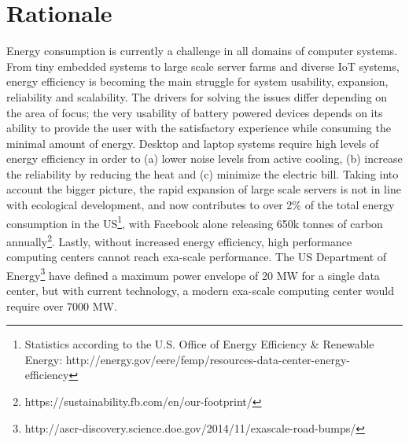 \documentclass{article}
\begin{document}
\section{Rationale}
Energy consumption is currently a challenge in all domains of computer systems.
From tiny embedded systems to large scale server farms and diverse IoT systems, energy efficiency is becoming the main struggle for system usability, expansion, reliability and scalability.
The drivers for solving the issues differ depending on the area of focus;
the very usability of battery powered devices depends on its ability to provide the user with the satisfactory experience while consuming the minimal amount of energy.
Desktop and laptop systems require high levels of energy efficiency in order to (a) lower noise levels from active cooling, (b) increase the reliability by reducing the heat and (c) minimize the electric bill.
Taking into account the bigger picture, the rapid expansion of large scale servers is not in line with ecological development, and now contributes to over 2\% of the total energy consumption in the US\footnote{Statistics according to the U.S. Office of Energy Efficiency \& Renewable Energy: http://energy.gov/eere/femp/resources-data-center-energy-efficiency}, with Facebook alone releasing 650k tonnes of carbon annually\footnote{https://sustainability.fb.com/en/our-footprint/}.
Lastly, without increased energy efficiency, high performance computing centers cannot reach exa-scale performance.
The US Department of Energy\footnote{http://ascr-discovery.science.doe.gov/2014/11/exascale-road-bumps/} have defined a maximum power envelope of 20 MW for a single data center, but with current technology, a modern exa-scale computing center would require over 7000 MW.\smallskip
\end{document}
